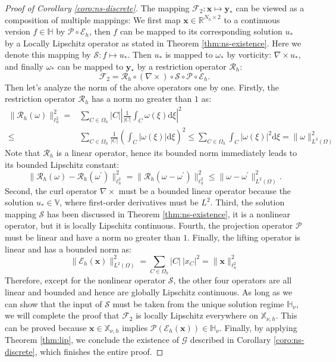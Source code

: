 \documentclass{amsart} %
\def\vx{{\bm{x}}}
\def\vy{{\bm{y}}}
\def\sH{{\mathbb{H}}}
\def\sR{{\mathbb{R}}}
\def\sV{{\mathbb{V}}}
\def\sX{{\mathbb{X}}}
\def\cE{{\mathcal{E}}}
\def\cF{{\mathcal{F}}}
\def\cG{{\mathcal{G}}}
\def\cP{{\mathcal{P}}}
\def\cR{{\mathcal{R}}}
\def\cS{{\mathcal{S}}}
\theoremstyle{definition}
\theoremstyle{remark}
\begin{document}
\begin{proof}[Proof of Corollary \ref{coro:ns-discrete}]
The mapping $\cF_{2}:\vx \mapsto \vy_\ast$ can be viewed as a composition of multiple mappings: We first map $\vx \in \sR^{N_h \times 2}$ to a continuous version $f \in \sH$ by $\cP \circ \cE_h$, then $f$ can be mapped to its corresponding solution $u_\ast$ by a Locally Lipschitz operator as stated in Theorem \ref{thm:ns-existence}. Here we denote this mapping by $\cS: f \mapsto u_\ast$. Then $u_\ast$ is mapped to $\omega_\ast$ by vorticity: $\nabla \times u_\ast$, and finally $\omega_\ast$ can be mapped to $\vy_\ast$ by a restriction operator $\cR_h$:
\[ \cF_2 = \cR_h \circ (\nabla \times) \circ \cS \circ \cP \circ \cE_h. \]
Then let's analyze the norm of the above operators one by one. Firstly, the restriction operator $\cR_h$ has a norm no greater than $1$ as:
\begin{align*}
\| \cR_h(\omega) \|^2_{\ell^2_h} 
= & \sum_{C \in \Omega_h} |C| \left|  \frac{1}{|C|}\int_{C} \omega(\xi) \mathrm{d}\xi \right|^2 \\
\leq & \sum_{C \in \Omega_h} \frac{1}{|C|} \left(  \int_{C} |\omega(\xi)|\mathrm{d}\xi \right)^2 
\leq \sum_{C \in \Omega_h} \int_{C} |\omega(\xi)|^2 \mathrm{d}\xi = \|\omega\|^2_{L^2(\Omega)}
\end{align*}
Note that  $\cR_h$ is a linear operator, hence its bounded norm immediately leads to its bounded Lipschitz constant:
\[ \| \cR_h(\omega) - \cR_h(\omega^\prime) \|^2_{\ell^2_h} 
= \| \cR_h(\omega - \omega^\prime) \|^2_{\ell^2_h} 
\leq \|\omega - \omega^\prime\|^2_{L^2(\Omega)}. \]
Second, the curl operator $\nabla \times$ must be a bounded linear operator because the solution $u_\ast \in \sV$, where first-order derivatives must be $L^2$. Third, the solution mapping $\cS$ has been discussed in Theorem \ref{thm:ns-existence}, it is a nonlinear operator, but it is locally Lipschitz continuous. Fourth, the projection operator $\cP$ must be linear and have a norm no greater than $1$. Finally, the lifting operator is linear and has a bounded norm as:
\[ \|\cE_h(\vx)\|^2_{L^2(\Omega)} = \sum_{C \in \Omega_h} |C| ~ |x_C|^2 = \|\vx\|^2_{\ell^2_h} \]
Therefore, except for the nonlinear operator $\cS$, the other four operators are all linear and bounded and hence are globally Lipschitz continuous. As long as we can show that the input of $\cS$ must be taken from the unique solution regime $\sH_{\nu}$, we will complete the proof that $\cF_2$ is locally Lipschitz everywhere on $\sX_{\nu,h}$. This can be proved because $\vx \in \sX_{\nu,h}$ implies $\cP(\cE_{h}(\vx)) \in \sH_{\nu}$. Finally, by applying Theorem \ref{thm:lip}, we conclude the existence of $\cG$ described in Corollary \ref{coro:ns-discrete}, which finishes the entire proof.
\end{proof}
\end{document}

